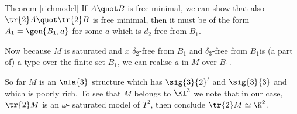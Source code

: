 \begin{proofof}{Theorem \ref{richmodel}}
If $A\quot B$ is free minimal, we can show that
also $\tr{2}A\quot\tr{2}B$ is free minimal, then it must be of the form $A_{1}=\gen{B_{1},a}$ for some
$a$ which is $d_{2}$-free from $B_{1}$.

Now because $M$ is saturated and \lqq$x$ $\delta_{2}$-free from $B_{1}$ and $\delta_{3}$-free from
$B_{1}$\rqq  is (a part of) a type over the finite set $B_{1}$, we can realise $a$ in $M$ over $B_{1}$.

So far $M$ is an $\nla{3}$ structure which has $\sig{3}{2}^{\prime}$ and $\sig{3}{3}$ and which
is poorly rich. To see that $M$ belongs to $\Kl^{3}$ we note that in our case, $\tr{2}M$ is an $\omega$-
saturated model of $T^{2}$, then conclude $\tr{2}M\simeq\K^{2}$.
\end{proofof}